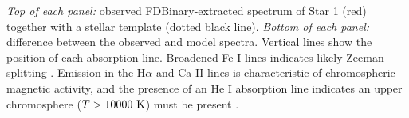 \label{fig:emission1} \emph{Top of each panel:} observed FDBinary-extracted spectrum of Star 1 (red) together with a stellar template (dotted black line). \emph{Bottom of each panel:} difference between the observed and model spectra. Vertical lines show the position of each absorption line. Broadened Fe I lines indicates likely Zeeman splitting \citep{har73}. Emission in the H$\alpha$ and Ca II lines is characteristic of chromospheric magnetic activity, and the presence of an He I absorption line indicates an upper chromosphere ($T > 10000 \ \rm{K}$) must be present \citep{fro12}.
  
  
  
  
  
  